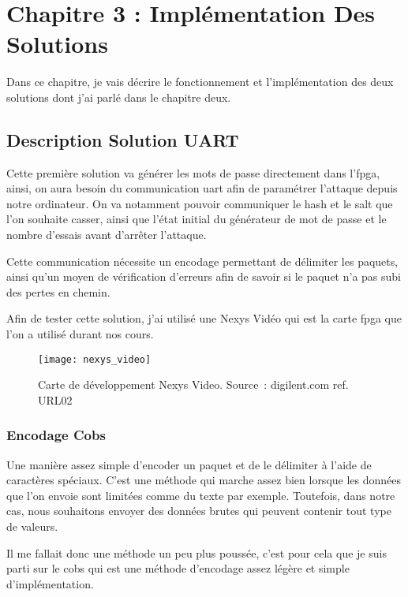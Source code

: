 \chapter{Chapitre 3 : Implémentation Des Solutions}

Dans ce chapitre, je vais décrire le fonctionnement et l'implémentation des deux solutions dont j'ai parlé dans le chapitre deux.

\section{Description Solution UART}

Cette première solution va générer les mots de passe directement dans l’\gls{fpga}, ainsi, on aura besoin du communication \gls{uart} afin de paramétrer l’attaque depuis notre ordinateur. 
On va notamment pouvoir communiquer le hash et le salt que l’on souhaite casser, ainsi que l’état initial du générateur de mot de passe et le nombre d’essais avant d’arrêter l'attaque.

Cette communication nécessite un encodage permettant de délimiter les paquets, ainsi qu'un moyen de vérification d'erreurs afin de savoir si le paquet n'a pas subi des pertes en chemin.

Afin de tester cette solution, j'ai utilisé une Nexys Vidéo qui est la carte \gls{fpga} que l'on a utilisé durant nos cours.

\begin{figure}[tbph!]
	\centering
	\texttt{[image: nexys\_video]}
	\caption[Carte de développement Nexys Video]{Carte de développement Nexys Video. Source : digilent.com ref. URL02}
	\label{fig:nexys_video}
\end{figure}

\subsection{Encodage Cobs}

Une manière assez simple d’encoder un paquet et de le délimiter à l’aide de caractères spéciaux. 
C’est une méthode qui marche assez bien lorsque les données que l’on envoie sont limitées comme du texte par exemple. 
Toutefois, dans notre cas, nous souhaitons envoyer des données brutes qui peuvent contenir tout type de valeurs.

Il me fallait donc une méthode un peu plus poussée, c’est pour cela que je suis parti sur le \gls{cobs} qui est une méthode d’encodage assez légère et simple d’implémentation.

